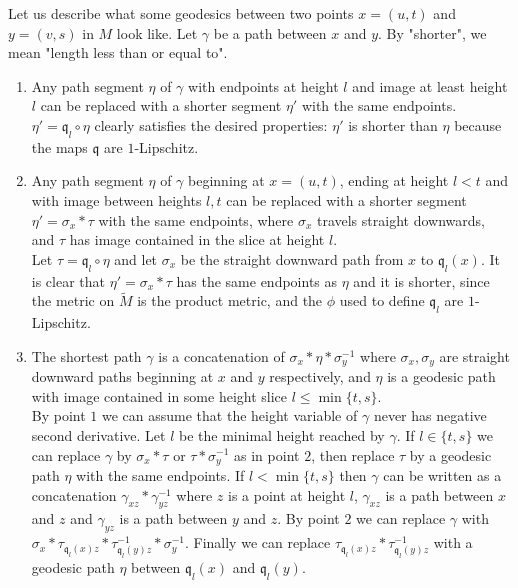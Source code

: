 \documentclass[a4paper,11pt]{article}
\theoremstyle{definition}
\theoremstyle{plain}
\theoremstyle{remark}
\begin{document}
{Let us describe what some geodesics between two points $x=(u,t)$ and $y = (v,s)$ in $M$ look like. Let $\gamma$ be a path between $x$ and $y$. By "shorter", we mean "length less than or equal to". 

\begin{enumerate}
\item Any path segment $\eta$ of $\gamma$ with endpoints at height $l$ and image at least height $l$ can be replaced with a shorter segment $\eta'$ with the same endpoints. \\

$\eta' = \mathfrak{q}_{l} \circ \eta$ clearly satisfies the desired properties: $\eta'$ is shorter than $\eta$ because the maps $\mathfrak{q}$ are $1$-Lipschitz.

\item Any path segment $\eta$ of $\gamma$ beginning at $x=(u,t)$, ending at height $l<t$ and with image between heights $l,t$ can be replaced with a shorter segment $\eta'= \sigma_x \ast \tau$ with the same endpoints, where $\sigma_x$ travels straight downwards, and $\tau$ has image contained in the slice at height $l$. \\

Let $\tau = \mathfrak{q}_{l} \circ \eta$ and let $\sigma_x$ be the straight downward path from $x$ to $\mathfrak{q}_{l}(x)$. It is clear that $\eta' = \sigma_{x}\ast \tau$ has the same endpoints as $\eta$ and it is shorter, since the metric on $\tilde{M}$ is the product metric, and the $\phi$ used to define $\mathfrak{q}_{l}$ are $1$-Lipschitz.

\item The shortest path $\gamma$ is a concatenation of $\sigma_{x}\ast \eta \ast \sigma_{y}^{-1}$ where $\sigma_{x},\sigma_{y}$ are straight downward paths beginning at $x$ and $y$ respectively, and $\eta$ is a geodesic path with image contained in some height slice $l\leq \min\{t,s\}$. \\

By point $1$ we can assume that the height variable of $\gamma$ never has negative second derivative. Let $l$ be the minimal height reached by $\gamma$. If $l\in \{t,s\}$ we can replace $\gamma$ by $\sigma_{x} \ast \tau$ or $\tau \ast \sigma_{y}^{-1}$ as in point $2$, then replace $\tau$ by a geodesic path $\eta$ with the same endpoints. If $l<\min \{t,s\}$ then $\gamma$ can be written as a concatenation $\gamma_{xz} \ast \gamma_{yz}^{-1}$ where $z$ is a point at height $l$, $\gamma_{xz}$ is a path between $x$ and $z$ and $\gamma_{yz}$ is a path between $y$ and $z$.  By point $2$ we can replace $\gamma$ with $\sigma_{x}\ast \tau_{\mathfrak{q}_{l}(x)z} \ast \tau_{\mathfrak{q}_{l}(y)z}^{-1}\ast \sigma_{y}^{-1}$. Finally we can replace $\tau_{\mathfrak{q}_{l}(x)z} \ast \tau_{\mathfrak{q}_{l}(y)z}^{-1}$ with a geodesic path $\eta$ between $\mathfrak{q}_{l}(x)$ and $\mathfrak{q}_{l}(y)$. 


\end{enumerate}}
\end{document}
